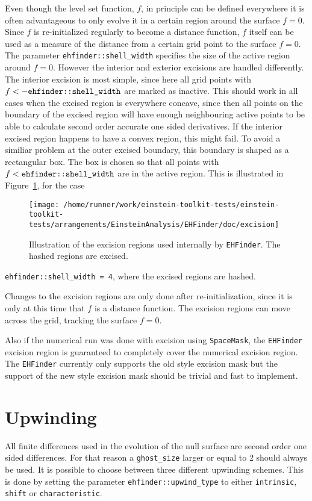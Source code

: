 Even though the level set function, $f$, in principle can be defined
everywhere it is often advantageous to only evolve it in a certain region
around the surface $f=0$. Since $f$ is re-initialized regularly to become
a distance function, $f$ itself can be used as a measure of the distance
from a certain grid point to the surface $f=0$. The parameter
{\tt ehfinder::shell\_width} specifies the size of the active region
around $f=0$. However the interior and exterior excisions are handled
differently. The interior excision is most simple, since here all grid points
with $f<-{\mbox{\tt ehfinder::shell\_width}}$ are marked as inactive. This
should work in all cases when the excised region is everywhere concave, since
then all points on the boundary of the excised region will have enough
neighbouring active points to be able to calculate second order accurate one
sided derivatives. If the interior excised region happens to have a convex
region, this might fail. To avoid a similiar problem at the outer excised
boundary, this boundary is shaped as a rectangular box. The box is chosen
so that all points with $f<{\mbox{\tt ehfinder::shell\_width}}$ are in the
active region. This is illustrated in
Figure~\ref{AEIThorns_EHFinder_excisefig}, for the case
\begin{figure}[ht]
  \begin{center}
    \texttt{[image: /home/runner/work/einstein-toolkit-tests/einstein-toolkit-tests/arrangements/EinsteinAnalysis/EHFinder/doc/excision]}
  \end{center}
  \caption{Illustration of the excision regions used internally by
           {\tt EHFinder}. The hashed regions are excised.}
  \label{AEIThorns_EHFinder_excisefig}
\end{figure}
{\tt ehfinder::shell\_width = 4}, where the excised regions are hashed.

Changes to the excision regions are only done after re-initialization,
since it is only at this time that $f$ is a distance function. The excision
regions can move across the grid, tracking the surface $f=0$.

Also if the numerical run was done with excision using {\tt SpaceMask},
the {\tt EHFinder} excision region is guaranteed to completely cover the 
numerical excision region. The {\tt EHFinder} currently only supports the
old style excision mask but the support of the new style excision mask
should be trivial and fast to implement.
\section{Upwinding}
\label{AEIThorns_EHFinder_upwind}
All finite differences used in the evolution of the null surface are second
order one sided differences. For that reason a {\tt ghost\_size} larger or
equal to 2 should always be used. It is possible to choose between three
different upwinding schemes. This is done by setting the parameter
{\tt ehfinder::upwind\_type} to either {\tt intrinsic}, {\tt shift} or
{\tt characteristic}.

